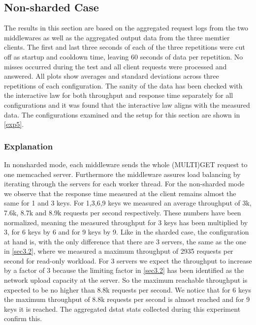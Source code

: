 \documentclass[11pt,a4paper]{article}
\begin{document}
\subsection{Non-sharded Case} \label{sec5.2}
The results in this section are based on the aggregated request logs from the two middlewares as well as the aggregated output data from the three memtier clients. The first and last three seconds of each of the three repetitions were cut off as startup and cooldown time, leaving 60 seconds of data per repetition. No misses occurred during the test and all client requests were processed and answered. All plots show averages and standard deviations across three repetitions of each configuration. The sanity of the data has been checked with the interactive law for both throughput and response time separately for all configurations and it was found that the interactive law aligns with the measured data. The configurations examined and the setup for this section are shown in \autoref{exp5}.


\subsubsection{Explanation}

In nonsharded mode, each middleware sends the whole (MULTI)GET request to one memcached server. Furthermore the middleware assures load balancing by iterating through the servers for each worker thread.
For the non-sharded mode we observe that the response time measured at the client remains almost the same for 1 and 3 keys. For 1,3,6,9 keys we measured an average throughput of 3k, 7.6k, 8.7k and 8.9k requests per second respectively. These numbers have been normalized, meaning the measured throughput for 3 keys has been multiplied by 3, for 6 keys by 6 and for 9 keys by 9.
Like in the sharded case, the configuration at hand is, with the only difference that there are 3 servers, the same as the one in \autoref{sec3.2}, where we measured a maximum throughput of 2935 requests per second for read-only workload. For 3 servers we expect the throughput to increase by a factor of 3 because the limiting factor in \autoref{sec3.2} has been identified as the network upload capacity at the server. So the maximum reachable throughput is expected to be no higher than 8.8k requests per second.
We notice that for 6 keys the maximum throughput of 8.8k requests per second is almost reached and for 9 keys it is reached. The aggregated dstat stats collected during this experiment confirm this.
\end{document}
